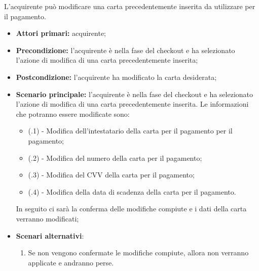L'acquirente può modificare una carta precedentemente inserita da utilizzare per il pagamento.
\begin{itemize}
    \item \textbf{Attori primari:} acquirente;
    \item \textbf{Precondizione:} l'acquirente è nella fase del checkout e ha selezionato l'azione di modifica di una carta precedentemente inserita;
    \item \textbf{Postcondizione:} l'acquirente ha modificato la carta desiderata;
    \item \textbf{Scenario principale:} l'acquirente è nella fase del checkout e ha selezionato l'azione di modifica di una carta precedentemente inserita. Le informazioni che potranno essere modificate sono:
    \begin{itemize}
        \item (\actualUC.1) - Modifica dell'intestatario della carta per il pagamento per il pagamento;
        \item (\actualUC.2) - Modifica del numero della carta per il pagamento;
        \item (\actualUC.3) - Modifica del CVV della carta per il pagamento;
        \item (\actualUC.4) - Modifica della data di scadenza della carta per il pagamento.
    \end{itemize}
    In seguito ci sarà la conferma delle modifiche compiute e i dati della carta verranno modificati;
    \item \textbf{Scenari alternativi}:
    \begin{enumerate}[label=\lett]
        \item Se non vengono confermate le modifiche compiute, allora non verranno applicate e andranno perse.
    \end{enumerate}
\end{itemize}

\resetSubUC


